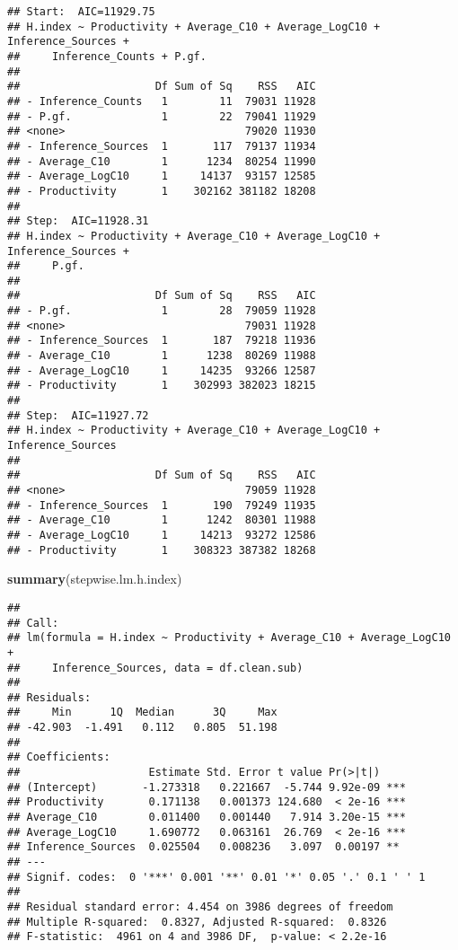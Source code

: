 \documentclass[
]{article}
\newenvironment{Shaded}{\begin{snugshade}}{\end{snugshade}}
\newcommand{\FunctionTok}[1]{\textcolor[rgb]{0.13,0.29,0.53}{\textbf{#1}}}
\newcommand{\NormalTok}[1]{#1}
\begin{document}
\begin{verbatim}
## Start:  AIC=11929.75
## H.index ~ Productivity + Average_C10 + Average_LogC10 + Inference_Sources + 
##     Inference_Counts + P.gf.
## 
##                     Df Sum of Sq    RSS   AIC
## - Inference_Counts   1        11  79031 11928
## - P.gf.              1        22  79041 11929
## <none>                            79020 11930
## - Inference_Sources  1       117  79137 11934
## - Average_C10        1      1234  80254 11990
## - Average_LogC10     1     14137  93157 12585
## - Productivity       1    302162 381182 18208
## 
## Step:  AIC=11928.31
## H.index ~ Productivity + Average_C10 + Average_LogC10 + Inference_Sources + 
##     P.gf.
## 
##                     Df Sum of Sq    RSS   AIC
## - P.gf.              1        28  79059 11928
## <none>                            79031 11928
## - Inference_Sources  1       187  79218 11936
## - Average_C10        1      1238  80269 11988
## - Average_LogC10     1     14235  93266 12587
## - Productivity       1    302993 382023 18215
## 
## Step:  AIC=11927.72
## H.index ~ Productivity + Average_C10 + Average_LogC10 + Inference_Sources
## 
##                     Df Sum of Sq    RSS   AIC
## <none>                            79059 11928
## - Inference_Sources  1       190  79249 11935
## - Average_C10        1      1242  80301 11988
## - Average_LogC10     1     14213  93272 12586
## - Productivity       1    308323 387382 18268
\end{verbatim}

\begin{Shaded}
\begin{Highlighting}[]
\FunctionTok{summary}\NormalTok{(stepwise.lm.h.index)}
\end{Highlighting}
\end{Shaded}

\begin{verbatim}
## 
## Call:
## lm(formula = H.index ~ Productivity + Average_C10 + Average_LogC10 + 
##     Inference_Sources, data = df.clean.sub)
## 
## Residuals:
##     Min      1Q  Median      3Q     Max 
## -42.903  -1.491   0.112   0.805  51.198 
## 
## Coefficients:
##                    Estimate Std. Error t value Pr(>|t|)    
## (Intercept)       -1.273318   0.221667  -5.744 9.92e-09 ***
## Productivity       0.171138   0.001373 124.680  < 2e-16 ***
## Average_C10        0.011400   0.001440   7.914 3.20e-15 ***
## Average_LogC10     1.690772   0.063161  26.769  < 2e-16 ***
## Inference_Sources  0.025504   0.008236   3.097  0.00197 ** 
## ---
## Signif. codes:  0 '***' 0.001 '**' 0.01 '*' 0.05 '.' 0.1 ' ' 1
## 
## Residual standard error: 4.454 on 3986 degrees of freedom
## Multiple R-squared:  0.8327, Adjusted R-squared:  0.8326 
## F-statistic:  4961 on 4 and 3986 DF,  p-value: < 2.2e-16
\end{verbatim}
\end{document}
